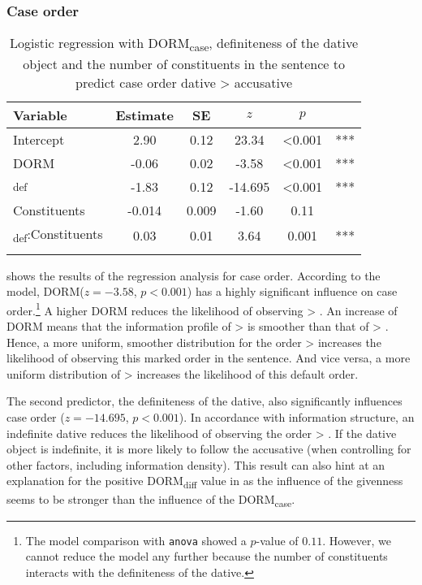\documentclass[output=paper,colorlinks,citecolor=brown]{langscibook}
\begin{document}
\subsubsection{Case order}

\begin{table}
    \begin{tabular}{l S[table-format=-1.2] S[table-format=1.3] S[table-format=-2.3] S[table-format=<1.3{***}] @{\,}  l}
    \lsptoprule
       Variable   & {Estimate} & {SE} & {$z$} & {$p$} &\\
       \midrule
    Intercept &    2.90  & 0.12 & 23.34 & <0.001&***\\
    \textnormal{DORM}\xspace &  -0.06 &   0.02 &  -3.58 & <0.001 & ***\\
 \ReichDat{}\textsubscript{def}          &     -1.83 &  0.12 & -14.695 & <0.001 & *** \\
      Constituents          &  -0.014  & 0.009  &-1.60 &0.11 \\
       \ReichDat{}\textsubscript{def}:Constituents       &0.03 &  0.01 &  3.64 & 0.001 &***\\
   \lspbottomrule
   \end{tabular}
   \caption{Logistic regression with \textnormal{DORM}\textsubscript{case}\xspace, definiteness of the dative object and the number of constituents in the sentence to predict case order dative > accusative}
   \label{Regession.AV:DA.OA.neu}
\end{table}


 shows the results of the regression analysis for case order.
According to the model, \textnormal{DORM}\xspace ($z=-3.58$, $p<0.001$) has a highly significant influence on case order.\footnote{The model comparison with \texttt{anova} showed a $p$-value of  $0.11$. However, we cannot reduce the model any further because the number of constituents interacts with the definiteness of the dative.}
A higher \textnormal{DORM}\xspace reduces the likelihood of observing \ReichDat{} > \ReichAcc{}. An increase of \textnormal{DORM}\xspace means that the information profile of \ReichAcc{} > \ReichDat{} is smoother than that of \ReichDat{} > \ReichAcc{}. Hence, a more uniform, smoother distribution for the order \ReichAcc{} > \ReichDat{} increases the likelihood of observing this marked order in the sentence. And vice versa, a more uniform distribution of \ReichDat{} > \ReichAcc{} increases the likelihood of this default order. 

The second predictor, the definiteness of the dative, also significantly influences case order ($z=-14.695$, $p<0.001$).
In accordance with information structure, an indefinite dative reduces the likelihood of observing the order \ReichDat{} > \ReichAcc{}. If the dative object is indefinite, it is more likely to follow the accusative (when controlling for other factors, including information density). This result can also hint at an explanation for the positive \textnormal{DORM}\textsubscript{diff}\xspace value in  as the influence of the givenness seems to be stronger than the influence of the \textnormal{DORM}\textsubscript{case}\xspace.
\end{document}
